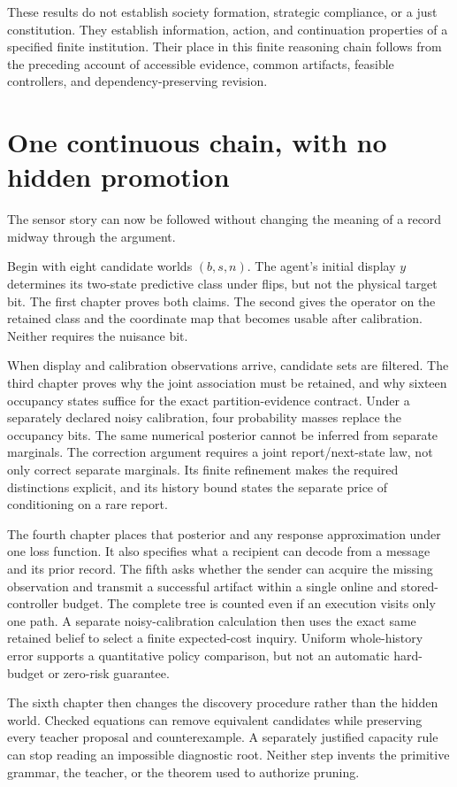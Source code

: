 These results do not establish society formation, strategic compliance, or a just constitution. They establish information, action, and continuation properties of a specified finite institution. Their place in this finite reasoning chain follows from the preceding account of accessible evidence, common artifacts, feasible controllers, and dependency-preserving revision.

\chapter{One continuous chain, with no hidden promotion}\label{ch:close}
The sensor story can now be followed without changing the meaning of a record midway through the argument.

Begin with eight candidate worlds $(b,s,n)$. The agent's initial display $y$ determines its two-state predictive class under flips, but not the physical target bit. The first chapter proves both claims. The second gives the operator on the retained class and the coordinate map that becomes usable after calibration. Neither requires the nuisance bit.

When display and calibration observations arrive, candidate sets are filtered. The third chapter proves why the joint association must be retained, and why sixteen occupancy states suffice for the exact partition-evidence contract. Under a separately declared noisy calibration, four probability masses replace the occupancy bits. The same numerical posterior cannot be inferred from separate marginals. The correction argument requires a joint report/next-state law, not only correct separate marginals. Its finite refinement makes the required distinctions explicit, and its history bound states the separate price of conditioning on a rare report.

The fourth chapter places that posterior and any response approximation under one loss function. It also specifies what a recipient can decode from a message and its prior record. The fifth asks whether the sender can acquire the missing observation and transmit a successful artifact within a single online and stored-controller budget. The complete tree is counted even if an execution visits only one path. A separate noisy-calibration calculation then uses the exact same retained belief to select a finite expected-cost inquiry. Uniform whole-history error supports a quantitative policy comparison, but not an automatic hard-budget or zero-risk guarantee.

The sixth chapter then changes the discovery procedure rather than the hidden world. Checked equations can remove equivalent candidates while preserving every teacher proposal and counterexample. A separately justified capacity rule can stop reading an impossible diagnostic root. Neither step invents the primitive grammar, the teacher, or the theorem used to authorize pruning.

